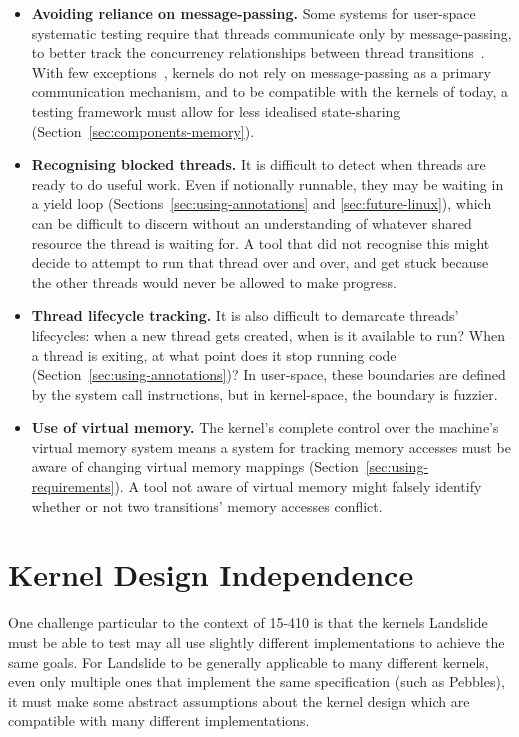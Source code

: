 \begin{itemize}
	\item {\bf Avoiding reliance on message-passing.} Some systems for user-space systematic testing require that threads communicate only by message-passing, to better track the concurrency relationships between thread transitions~\cite{dbug-ssv}. With few exceptions~\cite{barrelfish}, kernels do not rely on message-passing as a primary communication mechanism, and to be compatible with the kernels of today, a testing framework must allow for less idealised state-sharing (Section~\ref{sec:components-memory}).
	\item {\bf Recognising blocked threads.} It is difficult to detect when threads are ready to do useful work. Even if notionally runnable, they may be waiting in a yield loop (Sections~\ref{sec:using-annotations} and \ref{sec:future-linux}), which can be difficult to discern without an understanding of whatever shared resource the thread is waiting for. A tool that did not recognise this might decide to attempt to run that thread over and over, and get stuck because the other threads would never be allowed to make progress.
	\item {\bf Thread lifecycle tracking.} It is also difficult to demarcate threads' lifecycles: when a new thread gets created, when is it available to run? When a thread is exiting, at what point does it stop running code (Section~\ref{sec:using-annotations})? In user-space, these boundaries are defined by the system call instructions, but in kernel-space, the boundary is fuzzier.
	\item {\bf Use of virtual memory.} The kernel's complete control over the machine's virtual memory system means a system for tracking memory accesses must be aware of changing virtual memory mappings (Section~\ref{sec:using-requirements}). A tool not aware of virtual memory might falsely identify whether or not two transitions' memory accesses conflict.
\end{itemize}

\section{Kernel Design Independence}
\label{sec:challenges-design}

One challenge particular to the context of 15-410 is that the kernels Landslide must be able to test may all use slightly different implementations to achieve the same goals.
For Landslide to be generally applicable to many different kernels, even only multiple ones that implement the same specification (such as Pebbles), it must make some abstract assumptions about the kernel design which are compatible with many different implementations.

